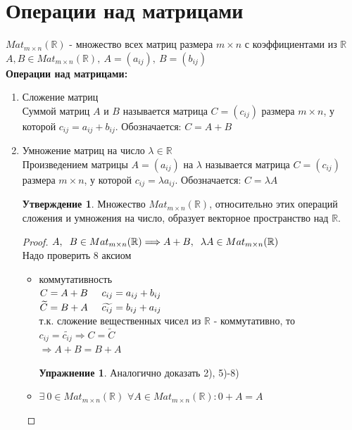 \documentclass[a4paper, 12pt]{article}
\newcommand{\R}{\mathbb R}
\newcommand\tab[1][.5cm]{\hspace*{#1}}
\theoremstyle{definition}
\newtheorem*{subtheorem}{Утверждение}
\newtheorem*{Exercise}{Упражнение}
\begin{document}
  \newpage
  
  \section{Операции над матрицами}
  $Mat_{m \times n}(\R)$ - множество всех матриц размера $m \times n$ с коэффициентами из $\R$ \\
  $A, B \in Mat_{m \times n}(\R), \ A=(a_{ij}), \ B=(b_{ij})$ \vspace{0.5cm}\\
  \textbf{Операции над матрицами:} 
  \begin{enumerate}
    \item Сложение матриц \\
    Суммой матриц $A$ и $B$ называется матрица $C=(c_{ij})$ размера $m \times n$, у которой $c_{ij} = a_{ij} + b_{ij}$. Обозначается: $C = A + B$
    \item Умножение матриц на число $\lambda \in \R$ \\ Произведением матрицы $A=(a_{ij})$ на $\lambda$ называется матрица $C=(c_{ij})$ размера $m \times n$, у которой $c_{ij} = \lambda a_{ij}$. Обозначается: $C = \lambda A$
    \begin{subtheorem}
      Множество $Mat_{m \times n}(\R)$, относительно этих операций сложения и умножения на число, образует векторное пространство над $\R$. 
    \end{subtheorem} 
    \begin{proof}
      $A,\tab [0.2cm]B \in Mat_{m \times n}(\R) \Longrightarrow A+B, \tab [0.2cm]\lambda A \in Mat_{m \times n}(\R)$ \\
      Надо проверить 8 аксиом
      \begin{itemize}
        \item[1)] коммутативность \\
        $C = A + B \tab[0.5cm] c_{ij} = a_{ij} + b_{ij}$ \\
        $\widetilde{C} = B + A \tab[0.5cm] \widetilde{c_{ij}} = b_{ij} + a_{ij}$ \\
        т.к. сложение вещественных чисел из $\R$ - коммутативно, то $c_{ij} = \widetilde{c_{ij}} \Longrightarrow C = \widetilde{C}$ \\
        $\Longrightarrow A + B = B + A$
        \begin{Exercise} Аналогично доказать 2), 5)-8)\end{Exercise}
        \item[3)] $\exists \ 0 \in Mat_{m \times n}(\R)$
        $\forall A \in Mat_{m \times n}(\R): 0 + A = A$ \\

\end{itemize}
\end{proof}
\end{enumerate}
\end{document}
